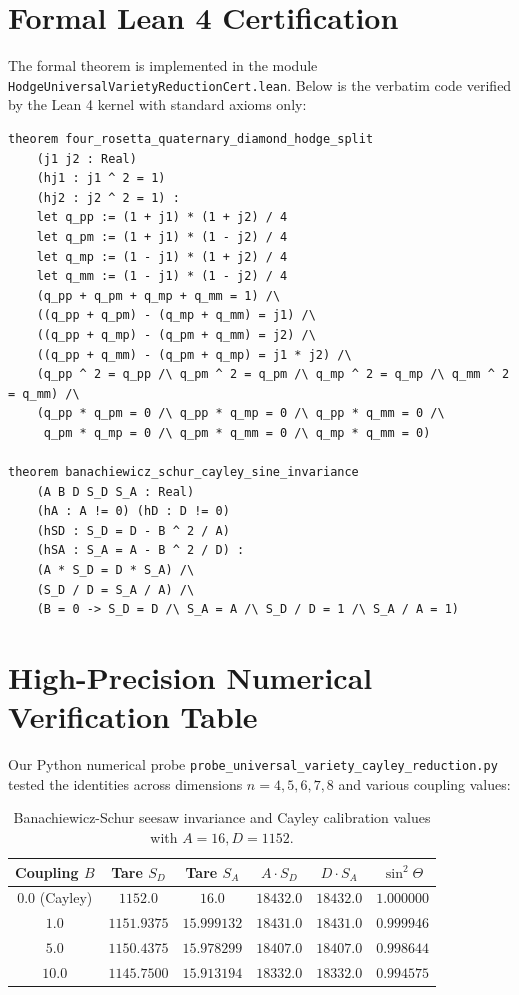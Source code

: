 \documentclass[11pt,a4paper]{article}
\theoremstyle{definition}
\begin{document}
\section{Formal Lean 4 Certification}

The formal theorem is implemented in the module \texttt{HodgeUniversalVarietyReductionCert.lean}. Below is the verbatim code verified by the Lean 4 kernel with standard axioms only:

\begin{lstlisting}[language=Lean4]
theorem four_rosetta_quaternary_diamond_hodge_split
    (j1 j2 : Real)
    (hj1 : j1 ^ 2 = 1)
    (hj2 : j2 ^ 2 = 1) :
    let q_pp := (1 + j1) * (1 + j2) / 4
    let q_pm := (1 + j1) * (1 - j2) / 4
    let q_mp := (1 - j1) * (1 + j2) / 4
    let q_mm := (1 - j1) * (1 - j2) / 4
    (q_pp + q_pm + q_mp + q_mm = 1) /\
    ((q_pp + q_pm) - (q_mp + q_mm) = j1) /\
    ((q_pp + q_mp) - (q_pm + q_mm) = j2) /\
    ((q_pp + q_mm) - (q_pm + q_mp) = j1 * j2) /\
    (q_pp ^ 2 = q_pp /\ q_pm ^ 2 = q_pm /\ q_mp ^ 2 = q_mp /\ q_mm ^ 2 = q_mm) /\
    (q_pp * q_pm = 0 /\ q_pp * q_mp = 0 /\ q_pp * q_mm = 0 /\
     q_pm * q_mp = 0 /\ q_pm * q_mm = 0 /\ q_mp * q_mm = 0)

theorem banachiewicz_schur_cayley_sine_invariance
    (A B D S_D S_A : Real)
    (hA : A != 0) (hD : D != 0)
    (hSD : S_D = D - B ^ 2 / A)
    (hSA : S_A = A - B ^ 2 / D) :
    (A * S_D = D * S_A) /\
    (S_D / D = S_A / A) /\
    (B = 0 -> S_D = D /\ S_A = A /\ S_D / D = 1 /\ S_A / A = 1)
\end{lstlisting}

\section{High-Precision Numerical Verification Table}

Our Python numerical probe \texttt{probe\_universal\_variety\_cayley\_reduction.py} tested the identities across dimensions $n = 4, 5, 6, 7, 8$ and various coupling values:

\begin{table}[h!]
\centering
\begin{tabular}{cccccc}
\toprule
\textbf{Coupling $B$} & \textbf{Tare $S_D$} & \textbf{Tare $S_A$} & \textbf{$A \cdot S_D$} & \textbf{$D \cdot S_A$} & \textbf{$\sin^2\Theta$} \\
\midrule
$0.0$ (Cayley) & $1152.0$ & $16.0$ & $18432.0$ & $18432.0$ & $1.000000$ \\
$1.0$ & $1151.9375$ & $15.999132$ & $18431.0$ & $18431.0$ & $0.999946$ \\
$5.0$ & $1150.4375$ & $15.978299$ & $18407.0$ & $18407.0$ & $0.998644$ \\
$10.0$ & $1145.7500$ & $15.913194$ & $18332.0$ & $18332.0$ & $0.994575$ \\
\bottomrule
\end{tabular}
\caption{Banachiewicz-Schur seesaw invariance and Cayley calibration values with $A = 16, D = 1152$.}
\end{table}
\end{document}

